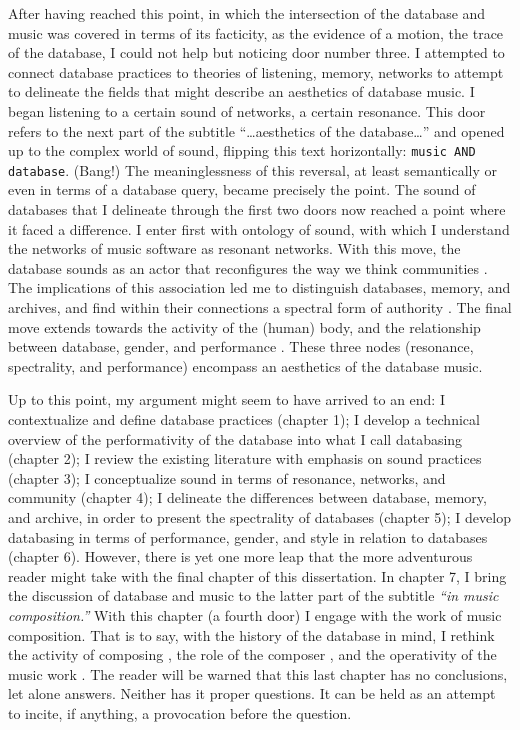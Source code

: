 After having reached this point, in which the intersection of the database and music was covered in terms of its facticity, as the evidence of a motion, the trace of the database, I could not help but noticing door number three.  I attempted to connect database practices to theories of listening, memory, networks to attempt to delineate the fields that might describe an aesthetics of database music. I began listening to a certain sound of networks, a certain resonance. This door refers to the next part of the subtitle ``\dots aesthetics of the database\dots'' and opened up to the complex world of sound, flipping this text horizontally: \texttt{music AND database}. (Bang!) The meaninglessness of this reversal, at least semantically or even in terms of a database query, became precisely the point. The sound of databases that I delineate through the first two doors now reached a point where it faced a difference. I enter first with  ontology of sound, with which I understand the networks of music software as resonant networks. With this move, the database sounds as an actor \parencite{Lat90:On} that reconfigures the way we think communities \parencite{Nan91:The}. The implications of this association led me to distinguish databases, memory, and archives, and find within their connections a spectral form of authority \parencites{Der78:Wri}{Der95:Arc}. The final move extends towards the activity of the (human) body, and the relationship between database, gender, and performance \parencite{But88:Per}. These three nodes (resonance, spectrality, and performance) encompass an aesthetics of the database music. 

Up to this point, my argument might seem to have arrived to an end: I contextualize and define database practices (chapter 1); I develop a technical overview of the performativity of the database into what I call databasing (chapter 2); I review the existing literature with emphasis on sound practices (chapter 3); I conceptualize sound in terms of resonance, networks, and community (chapter 4); I delineate the differences between database, memory, and archive, in order to present the spectrality of databases (chapter 5); I develop databasing in terms of performance, gender, and style in relation to databases (chapter 6). However, there is yet one more leap that the more adventurous reader might take with the final chapter of this dissertation. In chapter 7, I bring the discussion of database and music to the latter part of the subtitle \textit{``in music composition.''} With this chapter (a fourth door) I engage with the work of music composition. That is to say, with the history of the database in mind, I rethink the activity of composing \parencite{Vag01:Som}, the role of the composer \parencite{Lew99:Int}, and the operativity of the music work \parencite{Cas00:The}. The reader will be warned that this last chapter has no conclusions, let alone answers. Neither has it proper questions. It can be held as an attempt to incite, if anything, a provocation before the question.

